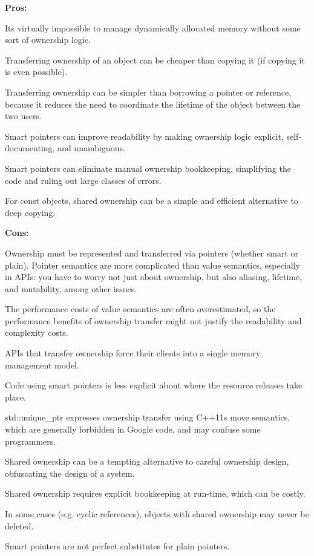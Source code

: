{\bfseries Pros\+:}


\begin{DoxyItemize}
\item It\textquotesingle{}s virtually impossible to manage dynamically allocated memory without some sort of ownership logic.
\item Transferring ownership of an object can be cheaper than copying it (if copying it is even possible).
\item Transferring ownership can be simpler than \textquotesingle{}borrowing\textquotesingle{} a pointer or reference, because it reduces the need to coordinate the lifetime of the object between the two users.
\item Smart pointers can improve readability by making ownership logic explicit, self-\/documenting, and unambiguous.
\item Smart pointers can eliminate manual ownership bookkeeping, simplifying the code and ruling out large classes of errors.
\item For const objects, shared ownership can be a simple and efficient alternative to deep copying.
\end{DoxyItemize}

{\bfseries Cons\+:}


\begin{DoxyItemize}
\item Ownership must be represented and transferred via pointers (whether smart or plain). Pointer semantics are more complicated than value semantics, especially in A\+P\+Is\+: you have to worry not just about ownership, but also aliasing, lifetime, and mutability, among other issues.
\item The performance costs of value semantics are often overestimated, so the performance benefits of ownership transfer might not justify the readability and complexity costs.
\item A\+P\+Is that transfer ownership force their clients into a single memory management model.
\item Code using smart pointers is less explicit about where the resource releases take place.
\item {\ttfamily std\+::unique\+\_\+ptr} expresses ownership transfer using C++11\textquotesingle{}s move semantics, which are generally forbidden in Google code, and may confuse some programmers.
\item Shared ownership can be a tempting alternative to careful ownership design, obfuscating the design of a system.
\item Shared ownership requires explicit bookkeeping at run-\/time, which can be costly.
\item In some cases (e.\+g. cyclic references), objects with shared ownership may never be deleted.
\item Smart pointers are not perfect substitutes for plain pointers.
\end{DoxyItemize}

